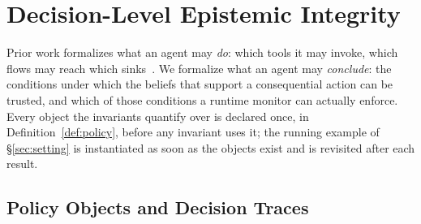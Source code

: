 \section{Decision-Level Epistemic Integrity}
\label{sec:definition}
Prior work formalizes what an agent may \emph{do}: which tools it may
invoke, which flows may reach which sinks~\cite{camel,cxi,argus}. We
formalize what an agent may \emph{conclude}: the conditions under which
the beliefs that support a consequential action can be trusted, and
which of those conditions a runtime monitor can actually enforce. Every
object the invariants quantify over is declared once, in
Definition~\ref{def:policy}, before any invariant uses it; the running
example of \S\ref{sec:setting} is instantiated as soon as the objects
exist and is revisited after each result.

\subsection{Policy Objects and Decision Traces}
\label{sec:prelim}

